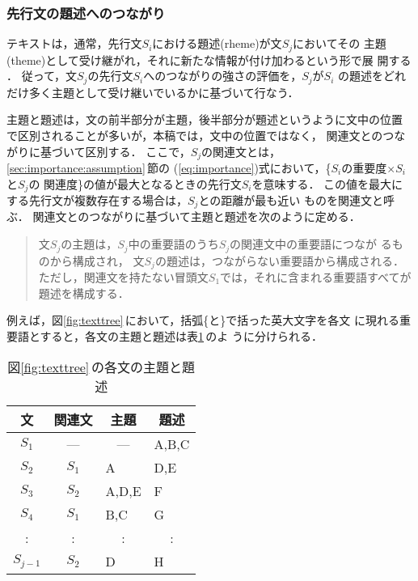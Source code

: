 \vspace{-1mm}
\subsubsection{先行文の題述へのつながり}
\label{sec:importance:relevance:rheme}

テキストは，通常，先行文$S_i$における題述(rheme)が文$S_j$においてその
主題(theme)として受け継がれ，それに新たな情報が付け加わるという形で展
開する
\cite{Givon79}．
従って，文$S_j$の先行文$S_i$へのつながりの強さの評価を，$S_j$が$S_i$
の題述をどれだけ多く主題として受け継いでいるかに基づいて行なう．

主題と題述は，文の前半部分が主題，後半部分が題述というように文中の位置
で区別されることが多い\cite{Fukuchi85}が，本稿では，文中の位置ではなく，
関連文とのつながりに基づいて区別する．
ここで，$S_j$の関連文とは，\ref{sec:importance:assumption}\,節の
(\ref{eq:importance})式において，\{$S_i$の重要度$\times$$S_i$と$S_j$の
関連度\}の値が最大となるときの先行文$S_i$を意味する．
この値を最大にする先行文が複数存在する場合は，$S_j$との距離が最も近い
ものを関連文と呼ぶ．
関連文とのつながりに基づいて主題と題述を次のように定める．
\begin{quote}
文$S_j$の主題は，$S_j$中の重要語のうち$S_j$の関連文中の重要語につなが
るものから構成され，
文$S_j$の題述は，つながらない重要語から構成される．
ただし，関連文を持たない冒頭文$S_1$では，それに含まれる重要語すべてが
題述を構成する．
\end{quote}
例えば，図\ref{fig:texttree}\,において，括弧\{と\}で括った英大文字を各文
に現れる重要語とすると，各文の主題と題述は表\ref{tab:theme-rheme}\,のよ
うに分けられる．
\begin{table}[htbp]
\caption{
図\protect\ref{fig:texttree}\,の各文の主題と題述}
\label{tab:theme-rheme}
\begin{center}
\begin{tabular}{|c||c|l|l|}\hline
文 & 関連文 & \multicolumn{1}{|c}{主題} & \multicolumn{1}{|c|}{題述}
\\\hline\hline
$S_1$     & ---	  & \multicolumn{1}{c|}{---} & A,B,C \\
$S_2$     & $S_1$ & A	  		     & D,E   \\
$S_3$     & $S_2$ & A,D,E		     & F     \\
$S_4$     & $S_1$ & B,C   		     & G     \\
:         & :     & \multicolumn{1}{c|}{:}   & \multicolumn{1}{c|}{:} \\
$S_{j-1}$ & $S_2$ & D     		     & H     \\\hline
\end{tabular}
\end{center}
\end{table}

